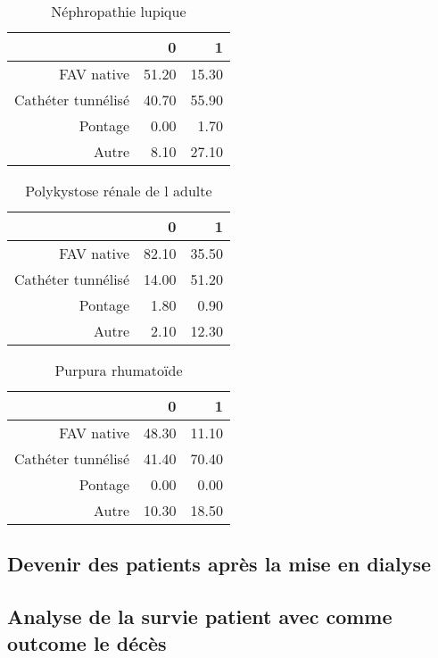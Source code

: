 \documentclass[11pt,a4paper]{article}\usepackage[]{graphicx}\usepackage[]{color}
\begin{document}
\begin{table}[H]
\centering
\begin{tabular}{rrr}
  \hline
 & 0 & 1 \\ 
  \hline
FAV native & 51.20 & 15.30 \\ 
  Cathéter tunnélisé & 40.70 & 55.90 \\ 
  Pontage & 0.00 & 1.70 \\ 
  Autre & 8.10 & 27.10 \\ 
   \hline
\end{tabular}
\caption{Néphropathie lupique} 
\end{table}
\begin{table}[H]
\centering
\begin{tabular}{rrr}
  \hline
 & 0 & 1 \\ 
  \hline
FAV native & 82.10 & 35.50 \\ 
  Cathéter tunnélisé & 14.00 & 51.20 \\ 
  Pontage & 1.80 & 0.90 \\ 
  Autre & 2.10 & 12.30 \\ 
   \hline
\end{tabular}
\caption{Polykystose rénale de l adulte} 
\end{table}
\begin{table}[H]
\centering
\begin{tabular}{rrr}
  \hline
 & 0 & 1 \\ 
  \hline
FAV native & 48.30 & 11.10 \\ 
  Cathéter tunnélisé & 41.40 & 70.40 \\ 
  Pontage & 0.00 & 0.00 \\ 
  Autre & 10.30 & 18.50 \\ 
   \hline
\end{tabular}
\caption{Purpura rhumatoïde} 
\end{table}



  \subsection{Devenir des patients après la mise en dialyse}
  
  \subsection{Analyse de la survie patient avec comme outcome le décès}
  
\end{document}
